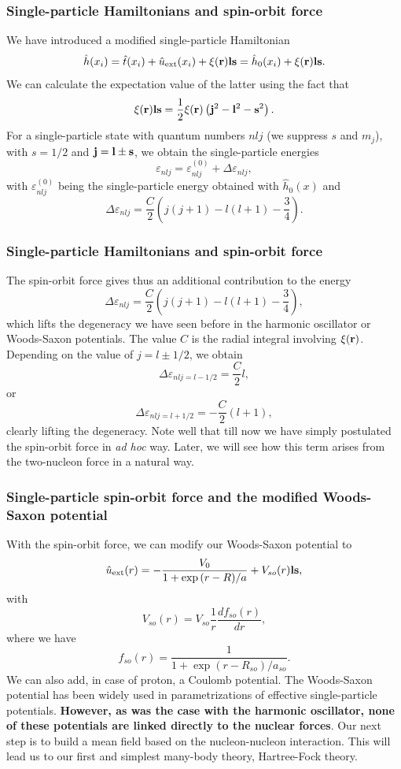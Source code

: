 \documentclass[compress]{beamer}
\begin{document}
\frame
{
  \frametitle{Single-particle Hamiltonians and spin-orbit force}
\begin{small}
{\scriptsize
We have introduced a modified single-particle Hamiltonian
\[
\hat{h}(x_i) =  \hat{t}(x_i) + \hat{u}_{\mathrm{ext}}(x_i) +\xi({\bf r}){\bf ls}=\hat{h}_0(x_i)+\xi({\bf r}){\bf ls}. 
\]
We can calculate the expectation value of the latter using the fact that
\[
\xi({\bf r}){\bf ls}=\frac{1}{2}\xi({\bf r})\left({\bf j}^2-{\bf l}^2-{\bf s}^2\right).
\]
For a single-particle state with quantum numbers $nlj$ (we suppress $s$ and $m_j$), with $s=1/2$ and ${\bf j=l}\pm {\bf s}$, we obtain
the single-particle energies
\[
\varepsilon_{nlj} = \varepsilon_{nlj}^{(0)}+\Delta\varepsilon_{nlj}, 
\]
with $\varepsilon_{nlj}^{(0)}$ being the single-particle energy obtained with $\hat{h}_0(x)$ and 
\[
\Delta\varepsilon_{nlj}=\frac{C}{2}\left(j(j+1)-l(l+1)-\frac{3}{4}\right).
\]
}
\end{small}
}



\frame
{
  \frametitle{Single-particle Hamiltonians and spin-orbit force}
\begin{small}
{\scriptsize
The spin-orbit force gives thus an additional contribution to the energy
\[
\Delta\varepsilon_{nlj}=\frac{C}{2}\left(j(j+1)-l(l+1)-\frac{3}{4}\right),
\]
which lifts the degeneracy we have seen before in the harmonic oscillator or Woods-Saxon potentials. The value $C$ is the radial
integral involving $\xi({\bf r})$. Depending on the value of $j=l\pm 1/2$, we obtain 
\[
\Delta\varepsilon_{nlj=l-1/2}=\frac{C}{2}l,
\]
or
\[
\Delta\varepsilon_{nlj=l+1/2}=-\frac{C}{2}(l+1),
\]
clearly lifting the degeneracy. Note well that till now we have simply postulated the spin-orbit force in {\em ad hoc} way.
Later, we will see how this term arises from the two-nucleon force in a natural way. 
}
\end{small}
}


\frame
{
  \frametitle{Single-particle spin-orbit force and the modified Woods-Saxon potential}
\begin{small}
{\scriptsize
With the spin-orbit force, we can modify our Woods-Saxon potential to 
\[
\hat{u}_{\mathrm{ext}}(r)=-\frac{V_0}{1+\exp{(r-R)/a}}+V_{so}(r){\bf ls},
\]
with 
\[
V_{so}(r) = V_{so}\frac{1}{r}\frac{d f_{so}(r)}{dr},
\]
where we have 
\[
f_{so}(r) = \frac{1}{1+\exp{(r-R_{so})/a_{so}}}.
\]
We can also add, in case of proton, a Coulomb potential. The Woods-Saxon potential has been widely used in parametrizations of
effective single-particle potentials. {\bf However, as was the case with the harmonic oscillator, none of these potentials are linked directly to the nuclear forces}. Our next step is to build a mean field based on the nucleon-nucleon interaction.
This will lead us to our first and simplest many-body theory, Hartree-Fock theory.  

}
\end{small}
}
\end{document}
